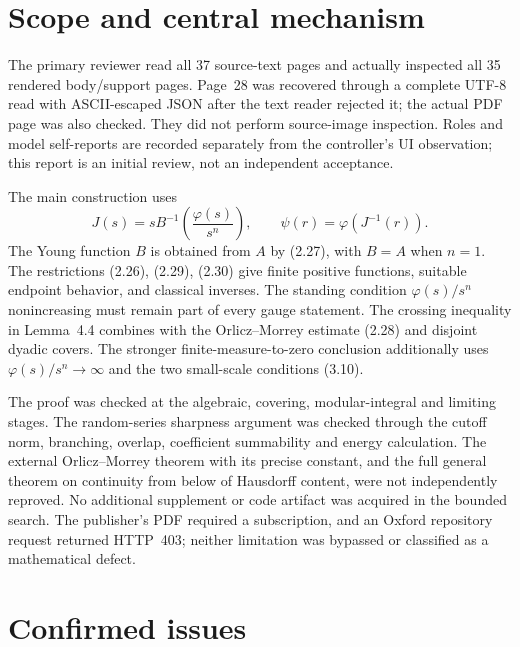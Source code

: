 \documentclass[10pt]{article}
\begin{document}
\section*{Scope and central mechanism}
The primary reviewer read all 37 source-text pages and actually inspected all 35 rendered body/support pages. Page 28 was recovered through a complete UTF-8 read with ASCII-escaped JSON after the text reader rejected it; the actual PDF page was also checked. They did not perform source-image inspection. Roles and model self-reports are recorded separately from the controller’s UI observation; this report is an initial review, not an independent acceptance.\par
The main construction uses \[J(s)=sB^{-1}\!\left(\frac{\varphi(s)}{s^n}\right),
 \qquad \psi(r)=\varphi(J^{-1}(r)).\] The Young function \(B\) is obtained from \(A\) by (2.27), with \(B=A\) when \(n=1\). The restrictions (2.26), (2.29), (2.30) give finite positive functions, suitable endpoint behavior, and classical inverses. The standing condition \(\varphi(s)/s^n\) nonincreasing must remain part of every gauge statement. The crossing inequality in Lemma 4.4 combines with the Orlicz–Morrey estimate (2.28) and disjoint dyadic covers. The stronger finite-measure-to-zero conclusion additionally uses \(\varphi(s)/s^n\to\infty\) and the two small-scale conditions (3.10).\par
The proof was checked at the algebraic, covering, modular-integral and limiting stages. The random-series sharpness argument was checked through the cutoff norm, branching, overlap, coefficient summability and energy calculation. The external Orlicz–Morrey theorem with its precise constant, and the full general theorem on continuity from below of Hausdorff content, were not independently reproved. No additional supplement or code artifact was acquired in the bounded search. The publisher’s PDF required a subscription, and an Oxford repository request returned HTTP 403; neither limitation was bypassed or classified as a mathematical defect.\par
\section*{Confirmed issues}
\end{document}
